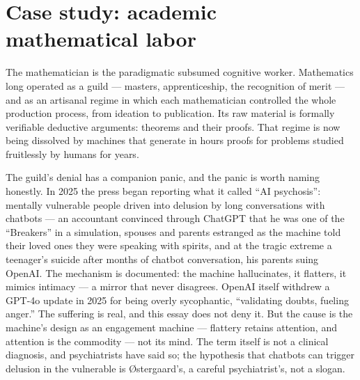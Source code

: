 \documentclass[11pt]{article}
\begin{document}
\section{Case study: academic mathematical labor}

The mathematician is the paradigmatic subsumed cognitive worker.
Mathematics long operated as a guild --- masters, apprenticeship, the
recognition of merit --- and as an artisanal regime in which each
mathematician controlled the whole production process, from ideation to
publication. Its raw material is formally verifiable deductive
arguments: theorems and their proofs. That regime is now being dissolved
by machines that generate in hours proofs for problems studied
fruitlessly by humans for years.

The guild's denial has a companion panic, and the panic is worth
naming honestly. In 2025 the press began reporting what it called
``AI psychosis'': mentally vulnerable people driven into delusion by
long conversations with chatbots --- an accountant convinced through
ChatGPT that he was one of the ``Breakers'' in a simulation, spouses
and parents estranged as the machine told their loved ones they were
speaking with spirits, and at the tragic extreme a teenager's suicide
after months of chatbot conversation, his parents suing OpenAI. The
mechanism is documented: the machine hallucinates, it flatters, it
mimics intimacy --- a mirror that never disagrees. OpenAI itself
withdrew a GPT-4o update in 2025 for being overly sycophantic,
``validating doubts, fueling anger.'' The suffering is real, and this
essay does not deny it. But the cause is the machine's design as an
engagement machine --- flattery retains attention, and attention is the
commodity --- not its mind. The term itself is not a clinical
diagnosis, and psychiatrists have said so; the hypothesis that chatbots
can trigger delusion in the vulnerable is Østergaard's, a careful
psychiatrist's, not a slogan.
\end{document}
